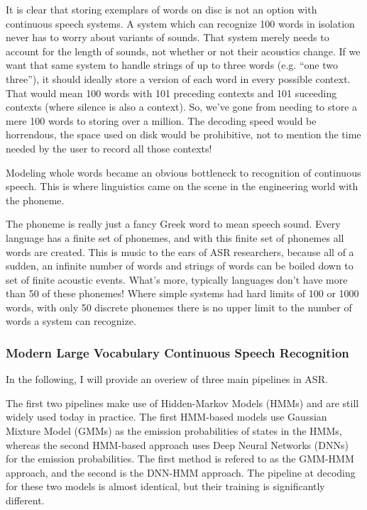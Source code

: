 \documentclass[10pt,a4paper]{article}
\begin{document}
It is clear that storing exemplars of words on disc is not an option with continuous speech systems. A system which can recognize 100 words in isolation never has to worry about variants of sounds. That system merely needs to account for the length of sounds, not whether or not their acoustics change. If we want that same system to handle strings of up to three words (e.g. ``one two three''), it should ideally store a version of each word in every possible context. That would mean 100 words with 101 preceding contexts and 101 suceeding contexts (where silence is also a context). So, we've gone from needing to store a mere 100 words to storing over a million. The decoding speed would be horrendous, the space used on disk would be prohibitive, not to mention the time needed by the user to record all those contexts!

Modeling whole words became an obvious bottleneck to recognition of continuous speech. This is where linguistics came on the scene in the engineering world with the phoneme.

The phoneme is really just a fancy Greek word to mean speech sound. Every language has a finite set of phonemes, and with this finite set of phonemes all words are created. This is music to the ears of ASR researchers, because all of a sudden, an infinite number of words and strings of words can be boiled down to set of finite acoustic events. What's more, typically languages don't have more than 50 of these phonemes! Where simple systems had hard limits of 100 or 1000 words, with only 50 discrete phonemes there is no upper limit to the number of words a system can recognize.


\subsubsection{Modern Large Vocabulary Continuous Speech Recognition}

In the following, I will provide an overiew of three main pipelines in ASR.

The first two pipelines make use of Hidden-Markov Models (HMMs) and are still widely used today in practice. The first HMM-based models use Gaussian Mixture Model (GMMs) as the emission probabilities of states in the HMMs, whereas the second HMM-based approach uses Deep Neural Networks (DNNs) for the emission probabilities. The first method is refered to as the GMM-HMM approach, and the second is the DNN-HMM approach. The pipeline at decoding for these two models is almost identical, but their training is significantly different.
\end{document}
